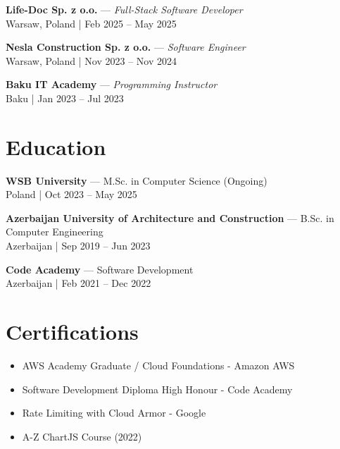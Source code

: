 \documentclass[11pt,a4paper]{article}
\begin{document}
\textbf{Life-Doc Sp. z o.o.} — \textit{Full-Stack Software Developer} \\
Warsaw, Poland | Feb 2025 – May 2025


\textbf{Nesla Construction Sp. z o.o.} — \textit{Software Engineer} \\
Warsaw, Poland | Nov 2023 – Nov 2024



\textbf{Baku IT Academy} — \textit{Programming Instructor} \\
Baku | Jan 2023 – Jul 2023




\section*{Education}

\textbf{WSB University} — M.Sc. in Computer Science (Ongoing) \\
Poland | Oct 2023 – May 2025

\textbf{Azerbaijan University of Architecture and Construction} — B.Sc. in Computer Engineering \\
Azerbaijan | Sep 2019 – Jun 2023

\textbf{Code Academy} — Software Development \\
Azerbaijan | Feb 2021 – Dec 2022

\section*{Certifications}
\begin{itemize}[leftmargin=*]
    \item AWS Academy Graduate / Cloud Foundations - Amazon AWS
    \item Software Development Diploma High Honour - Code Academy
    \item Rate Limiting with Cloud Armor - Google
    \item A-Z ChartJS Course (2022)
\end{itemize}
\end{document}
